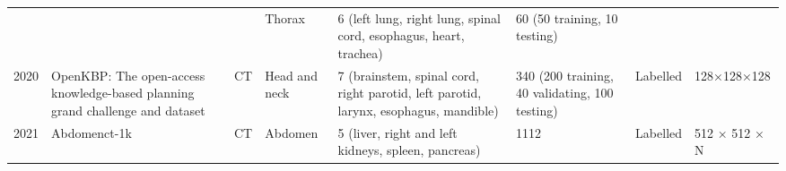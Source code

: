 \documentclass[lettersize,journal]{IEEEtran}
\begin{document}
\begin{table*}[ht!]
\begin{tabular}{@{}lm{}llm{}m{}m{}l@{}}
                      &                                                                                                                                                  &                     & Thorax                   & 6 (left lung, right lung, spinal cord, esophagus, heart, trachea)                                                                                                                                                                                                                                                                                                                       & 60 (50 training, 10 testing)                                             &                                                               &                                                \\
2020                  & OpenKBP: The open-access knowledge-based planning grand challenge and dataset \cite{35}                                                           & CT                  & Head and neck            & 7 (brainstem, spinal cord, right parotid, left parotid, larynx, esophagus, mandible)                                                                                                                                                                                                                                                                                                    & 340 (200 training, 40 validating, 100 testing)                           & Labelled                                                      & 128×128×128                                    \\
2021                  & Abdomenct-1k \cite{36}                                                                                                                            & CT                  & Abdomen                  & 5 (liver, right and left kidneys, spleen, pancreas)                                                                                                                                                                                                                                                                                                                                     & 1112                                                                     & Labelled                                                      & 512 × 512 × N                                  \\ \bottomrule
\end{tabular}
\end{table*}
\end{document}
